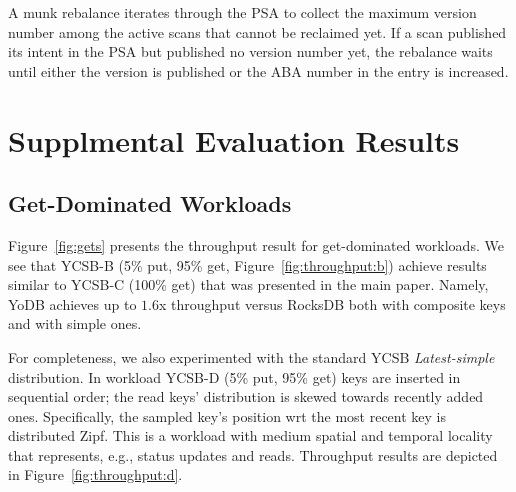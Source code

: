 \documentclass[letterpaper,twocolumn,10pt]{article}
\newcommand{\code}[1]{\textsf{\fontsize{9}{11}\selectfont #1}}
\newcommand{\sys}{YoDB}
\begin{document}
A munk rebalance iterates through the \code{PSA} to collect the maximum version number among the active scans that cannot be reclaimed yet. If a scan published its intent in the \code{PSA} but published no version number yet, the rebalance waits until either the version is published or the ABA number in the entry is increased. 

\section{Supplmental Evaluation Results}

\subsection{Get-Dominated Workloads}

Figure~\ref{fig:gets} presents the throughput result for get-dominated workloads.   
We see that YCSB-B (5\% put, 95\% get, Figure~\ref{fig:throughput:b}) achieve results similar  to YCSB-C (100\% get) that was presented in the main paper.
Namely, \sys\/ achieves up to $1.6$x throughput versus RocksDB both with composite keys and with simple ones.   

For completeness, we also experimented with the standard YCSB  \emph{Latest-simple} distribution.
In workload YCSB-D (5\% put, 95\% get) keys are inserted in sequential order; the read keys' distribution is skewed towards recently added ones. 
Specifically, the sampled key's position wrt the most recent key is distributed Zipf. This is a 
workload with medium spatial and temporal locality that represents, e.g., status updates and reads. Throughput results are depicted in Figure~\ref{fig:throughput:d}.
\end{document}
